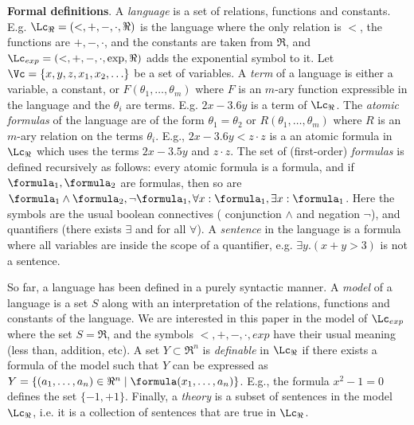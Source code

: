 \textbf{Formal definitions}.
A \emph{language} is a set of relations, functions and constants.
E.g. $\Lc_\Re = (<,+,-, \cdot,\Re)$ is the language where the only relation is $<$, the functions are $+,-,\cdot$, and the constants are taken from $\Re$,
and  $\Lc_{exp} = (<,+,-, \cdot,\exp, \Re)$ adds the exponential symbol to it.
Let $\Vc = \{x,y,z,x_1,x_2,\ldots\}$ be a set of variables.
A \emph{term} of a language is either a variable, a constant, or $F(\theta_1,\ldots,\theta_m)$ where $F$ is an $m$-ary function expressible in the language and the $\theta_i$ are terms.
E.g. $2x-3.6y$ is a term of $\Lc_\Re$.
The \emph{atomic formulas} of the language are of the form $\theta_1=\theta_2$ or $R(\theta_1,\ldots,\theta_m)$ where $R$ is an $m$-ary relation on the terms $\theta_i$.
E.g., $2x-3.6y < z\cdot z$ is a an atomic formula in $\Lc_\Re$ which uses the terms $2x-3.5y$ and $z \cdot z$.
The set of (first-order) \emph{formulas} is defined recursively as follows: every atomic formula is a formula, and if $\formula_1,\formula_2$ are formulas, then so are $\formula_1 \land \formula_2, \neg \formula_1, \forall x: \formula_1, \exists x:\formula_1$.
Here the symbols are the usual boolean connectives ( conjunction $\land$ and negation $\neg$), and quantifiers (there exists $\exists$ and for all $\forall$).
A \emph{sentence} in the language is a formula where all variables are inside the scope of a quantifier, e.g. $\exists y . (x+y>3)$ is not a sentence.

So far, a language has been defined in a purely syntactic manner.
A \emph{model} of a language is a set $S$ along with an interpretation of the relations, functions and constants of the language.
We are interested in this paper in the model of $\Lc_{exp}$ where the set $S = \Re$, and the symbols $<,+,-, \cdot,exp$ have their usual meaning (less than, addition, etc).
A set $Y \subset \Re^n$ is \emph{definable} in $\Lc_\Re$ if there exists a formula of the model such that $Y$ can be expressed as $Y = \{(a_1,\ldots,a_n) \in \Re^n \;|\; \formula(x_1,\ldots,a_n)\}$.
E.g., the formula $x^2-1=0$ defines the set $\{-1,+1\}$.
Finally, a \emph{theory} is a subset of sentences in the model $\Lc_\Re$, i.e. it is a collection of sentences that are true in $\Lc_\Re$.